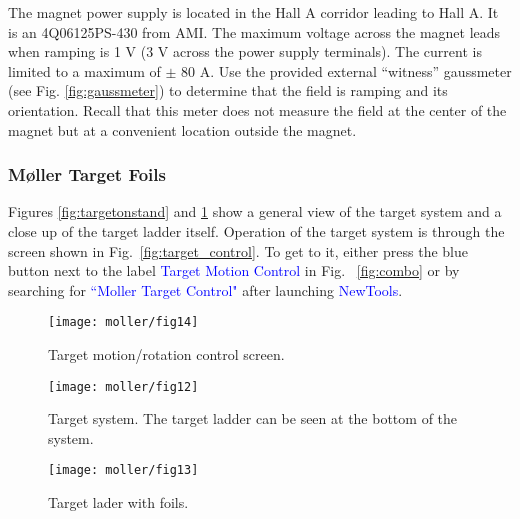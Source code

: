 {The magnet power supply is located in the Hall A corridor leading to Hall A. It is an 4Q06125PS-430 from AMI.
The maximum voltage across the magnet leads when ramping is 1 V (3 V across the power supply terminals). The current is limited to a maximum of $\pm$ 80 A. 
Use the provided external ``witness''
gaussmeter (see Fig. \ref{fig:gaussmeter}) to determine that the field is ramping and its orientation. Recall that this meter does not measure the field at the center of the magnet but at a convenient location outside the magnet.
\subsubsection{M{\o}ller Target Foils}
Figures \ref{fig:targetonstand} and \ref{fig:foils} show a general view of the target system and a close up of the target ladder itself.
Operation of the target system is through the screen shown in
Fig.~\ref{fig:target_control}. To get to it, either press the blue button next to the label \textcolor{blue}{Target Motion Control} in
Fig. ~\ref{fig:combo} or by searching for \textcolor{blue}{``Moller Target Control"} after launching \textcolor{blue}{NewTools}.


\begin{figure}
\begin{minipage}[c]{0.45\linewidth}
          \texttt{[image: moller/fig14]}
      \caption[Target control screen]{Target motion/rotation control screen.}
      \label{fig:target_control} 
\end{minipage}
\hfill
\begin{minipage}[c]{0.45\linewidth}
     \texttt{[image: moller/fig12]}
 \caption[Target System]{Target system. The target ladder can be seen at the bottom of the system.}
\label{fig:targetonstand} 
\end{minipage}%
      \begin{center}
\texttt{[image: moller/fig13]}
\caption[Target ladder detail]{Target lader with foils.}
 \label{fig:foils} 
      \end{center}
   \end{figure}  

}
